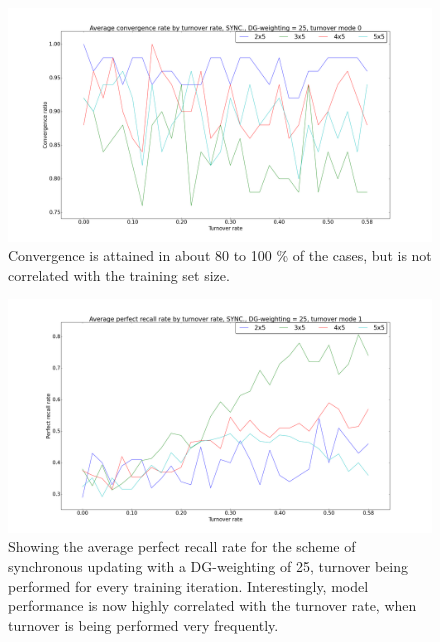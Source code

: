\begin{figure}
    \centering
    \includegraphics[width=14cm]{fig/avg_convergence_by_turnover_rate_sync_dgw_25_t_m_0_no_err_bars}
    \caption{Convergence is attained in about 80 to 100 \% of the cases, but is not correlated with the training set size.}
    \label{fig:avg_convergence_by_turnover_rate_sync_dgw_25_t_m_0_no_err_bars}
\end{figure}

\begin{figure}
    \centering
    \includegraphics[width=14cm]{fig/average_perfect_recall_rates_by_set_size_sync_dgw_25_t_m_1_no_err_bars}
    \caption{Showing the average perfect recall rate for the scheme of synchronous updating with a DG-weighting of 25, turnover being performed for every training iteration. Interestingly, model performance is now highly correlated with the turnover rate, when turnover is being performed very frequently.}
    \label{fig:average_perfect_recall_rates_by_set_size_sync_dgw_25_t_m_1_no_err_bars}
\end{figure}

